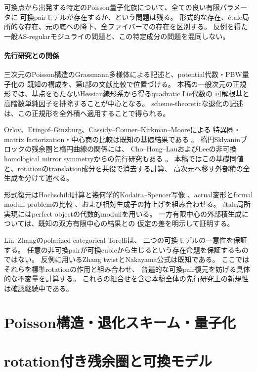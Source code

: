 可換点から出発する特定のPoisson量子化族について、全ての良い有限パラメータに
可換pairモデルが存在するか、という問題は残る。
形式的な存在、étale局所的な存在、元の底への降下、全ファイバーでの存在を区別する。
反例を得た一般AS-regularモジュライの問題と、この特定成分の問題を混同しない。

\subsection{先行研究との関係}

三次元のPoisson構造のGrassmann多様体による記述と、potential代数・PBW量子化の
既知の構成を、第I部の文献比較で位置づける。
本稿の一般次元の正規形では、基点をもたないHessian線形系から得るquadratic Lie代数の
可解根基と高階数単純因子を排除することが中心となる。
scheme-theoreticな退化の記述は、この正規形を全外積へ適用することで得られる。

Orlov、Etingof--Ginzburg、Cassidy--Conner--Kirkman--Mooreによる
特異圏・matrix factorization・中心商の比較は既知の基礎結果である
\cite{Orlov,EG,CCKM}。
楕円Sklyaninブロックの残余圏と楕円曲線の関係には、
Cho--Hong--LauおよびLeeの非可換homological mirror symmetryからの先行研究もある
\cite{CHL,Lee}。
本稿ではこの基礎同値と、rotationのtranslation成分を共役で消去する計算、
高次元へ移す外部積の全生成を分けて述べる。

形式復元はHochschild計算と幾何学的Kodaira--Spencer写像
\cite{BFK,HR,JLLZ}、actual変形とformal moduli problemの比較
\cite{Lurie,BKP}、および相対生成子の持上げ\cite{DDL}を組み合わせる。
étale局所実現にはperfect objectの代数的moduli\cite{TV}を用いる。
一方有限中心の外部積生成については、既知の双方有限中心の結果\cite{ELS}との
仮定の差を明示して証明する。

Lin--Zhangのpolarized categorical Torelli\cite[Theorem 1.7]{LZ}は、
二つの可換モデルの一意性を保証する。
任意の非可換pairが可換cubicから生じるという存在命題を保証するものではない。
反例に用いるZhang twistとNakayama公式は既知である\cite{ZhangTwist,RRZ}。
ここではそれらを標準rotationの作用\cite[Proposition 3.12]{Huy}と組み合わせ、
普遍的な可換pair復元を妨げる具体的な不変量を計算する。
これらの組合せを含む本稿全体の先行研究上の新規性は確認継続中である。



\part{Poisson構造・退化スキーム・量子化}



\part{rotation付き残余圏と可換モデル}






